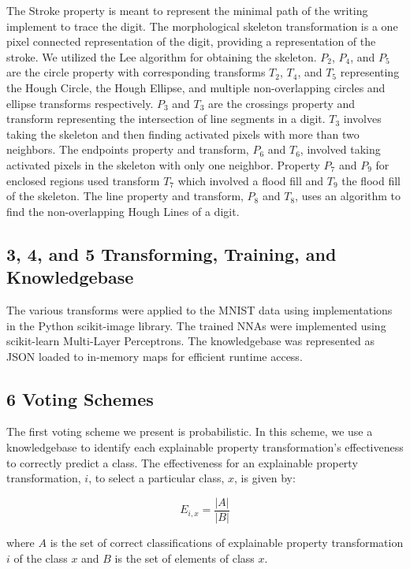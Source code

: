 \documentclass[conference]{IEEEtran}
\begin{document}
The Stroke property is meant to represent the minimal path of the writing implement to trace the digit.  The morphological skeleton transformation is a one pixel connected representation of the digit, providing a representation of the stroke.  We utilized the Lee\cite{Lee1994} algorithm for obtaining the skeleton.
$P_2$, $P_4$, and $P_5$ are the circle property with corresponding transforms $T_2$, $T_4$, and $T_5$ representing the Hough Circle, the Hough Ellipse, and multiple non-overlapping circles and ellipse transforms respectively.
$P_3$ and $T_3$ are the crossings property and transform representing the intersection of line segments in a digit.  $T_3$ involves taking the skeleton and then finding activated pixels with more than two neighbors.   The endpoints property and transform, $P_6$ and $T_6$, involved taking activated pixels in the skeleton with only one neighbor.
Property $P_7$ and $P_9$ for enclosed regions used transform $T_7$ which involved a flood fill and $T_9$ the flood fill of the skeleton.  The line property and transform, $P_8$ and $T_8$, uses an algorithm to find the non-overlapping Hough Lines of a digit.

\subsection{3, 4, and 5 Transforming, Training, and Knowledgebase}

The various transforms were applied to the MNIST data using implementations in the Python scikit-image library.  The trained NNAs were implemented using scikit-learn Multi-Layer Perceptrons.  The knowledgebase was represented as JSON loaded to in-memory maps for efficient runtime access.

\subsection{6 Voting Schemes}
\label{subsection:Voting}

The first voting scheme we present is probabilistic.  In this scheme, we use a knowledgebase to identify each explainable property transformation's effectiveness to correctly predict a class.   The effectiveness for an explainable property transformation, $i$, to select a particular class, $x$,  is given by:

\begin{equation}\label{effectiveness}
E_{i,x}  = \frac{|A|}{|B|}
\end{equation}

where $A$ is the set of correct classifications of explainable property transformation $i$ of the class $x$ and $B$ is the set of elements of class $x$. 
\end{document}
